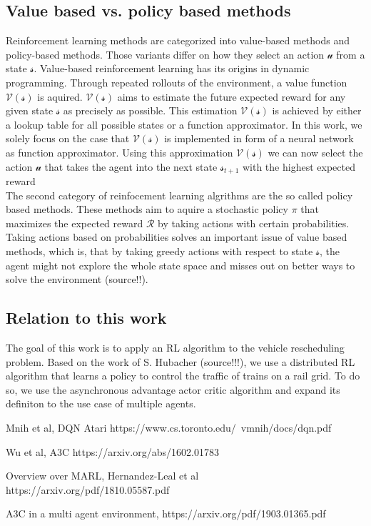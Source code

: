 \subsection*{Value based vs. policy based methods}\label{value_policy_based_methods}
Reinforcement learning methods are categorized into value-based methods and policy-based methods. Those variants differ on how they select an action $\mathcal{u}$ from a state $\mathcal{s}$.
Value-based reinforcement learning has its origins in dynamic programming. Through repeated rollouts of the environment, a value function $\mathcal{V(s)}$
is aquired. $\mathcal{V(s)}$ aims to estimate the future expected reward for any given state $\mathcal{s}$ as precisely as possible. This estimation $\mathcal{V(s)}$ is achieved by either a lookup table for all possible states or a function approximator. In this work, we solely focus on the case that $\mathcal{V(s)}$ is implemented in form of a neural network as function approximator. Using this approximation $\mathcal{V(s)}$ we can now select the action $\mathcal{u}$ that takes the agent into the next state $\mathcal{s}_{t+1}$ with the highest expected reward \\
The second category of reinfocement learning algrithms are the so called policy based methods. These methods aim to aquire a stochastic policy $\pi$ that maximizes the expected reward $\mathcal{R}$ by taking actions with certain probabilities. Taking actions based on probabilities solves an important issue of value based methods, which is, that by taking greedy actions with respect to state  $\mathcal{s}$, the agent might not explore the whole state space and misses out on better ways to solve the environment (source!!).
\subsection*{Relation to this work}\label{rl_relation_work}
The goal of this work is to apply an RL algorithm to the vehicle rescheduling problem. Based on the work of S. Hubacher (source!!!), we use a distributed RL algorithm that learns a policy to control the traffic of trains on a rail grid. To do so, we use the asynchronous advantage actor critic algorithm and expand its definiton to the use case of multiple agents.





Mnih et al, DQN Atari
https://www.cs.toronto.edu/~vmnih/docs/dqn.pdf

Wu et al, A3C
https://arxiv.org/abs/1602.01783

Overview over MARL, Hernandez-Leal et al
https://arxiv.org/pdf/1810.05587.pdf

A3C in a multi agent environment, 
https://arxiv.org/pdf/1903.01365.pdf

